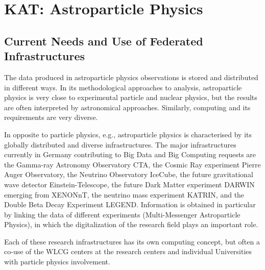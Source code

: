 \section{KAT: Astroparticle Physics} 


\subsection{Current Needs and Use of Federated Infrastructures}

The data produced in astroparticle physics observations is stored and 
distributed in different ways. 
In its methodological approaches to analysis, astroparticle physics is very close to experimental particle and nuclear physics, but the results are often interpreted by astronomical approaches. Similarly, computing and its requirements are very diverse. 

In opposite to particle physics, e.g., astroparticle physics is
characterised by its globally distributed and diverse infrastructures. 
The major infrastructures currently in Germany contributing to Big Data and Big Computing requests are the Gamma-ray Astronomy
Observatory CTA, the Cosmic Ray experiment Pierre Auger Observatory,
the Neutrino Observatory IceCube, the future gravitational wave detector Einstein-Telescope, the future Dark Matter experiment DARWIN emerging from XENONnT, the neutrino mass experiment KATRIN, and the Double Beta Decay
Experiment LEGEND. 
Information is obtained in particular by linking the
data of different experiments (Multi-Messenger Astroparticle Physics), in
which the digitalization of the research field plays an important role. 

Each of these research infrastructures has its own computing concept, but often a co-use of the WLCG centers at the research centers and individual Universities with particle physics involvement.  \\

